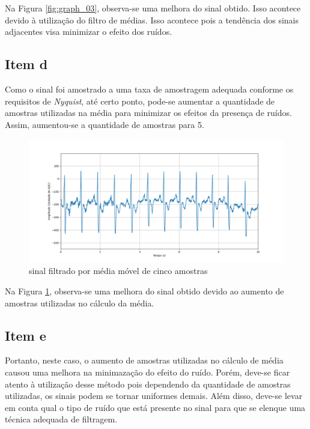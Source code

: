 Na Figura \ref{fig:graph_03}, observa-se uma melhora do sinal obtido. Isso acontece devido à utilização do filtro de médias. Isso acontece pois a tendência dos sinais adjacentes visa minimizar o efeito dos ruídos. 

\subsection{Item d}

Como o sinal foi amostrado a uma taxa de amostragem adequada conforme os requisitos de \textit{Nyquist}, até certo ponto, pode-se aumentar a quantidade de amostras utilizadas na média para minimizar os efeitos da presença de ruídos. Assim, aumentou-se a quantidade de amostras para 5. 

\begin{figure}[!htb]
    \centering
    \includegraphics[width=\linewidth]{Imagens/fig04.png}
    \caption{sinal filtrado por média móvel de cinco amostras}
    \label{fig:graph_04}
\end{figure}

Na Figura \ref{fig:graph_04}, observa-se uma melhora do sinal obtido devido ao aumento de amostras utilizadas no cálculo da média.

\subsection{Item e}

Portanto, neste caso, o aumento de amostras utilizadas no cálculo de média causou uma melhora na minimazação do efeito do ruído. Porém, deve-se ficar atento à utilização desse método pois dependendo da quantidade de amostras utilizadas, os sinais podem se tornar uniformes demais. Além disso, deve-se levar em conta qual o tipo de ruído que está presente no sinal para que se elenque uma técnica adequada de filtragem.

